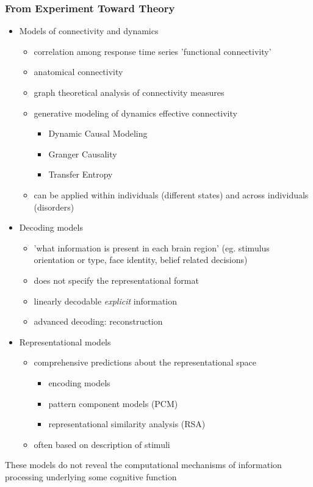 \documentclass[
t, %
10pt, %
aspectratio=1610, %
ngerman,
english,
]{beamer}
\begin{document}
\begin{frame}
    \frametitle{From Experiment Toward Theory}
    \begin{itemize}
     \item Models of connectivity and dynamics
     \begin{itemize}
        \item correlation among response time series \textrightarrow 'functional connectivity'
        \item anatomical connectivity
        \item graph theoretical analysis of connectivity measures
        \item generative modeling of dynamics \textrightarrow effective connectivity
        \begin{itemize}
         \item Dynamic Causal Modeling
         \item Granger Causality
         \item Transfer Entropy
        \end{itemize}
        \item can be applied within individuals (different states) and across individuals (disorders)
     \end{itemize}
     \item Decoding models
     \begin{itemize}
      \item 'what information is present in each brain region' (eg. stimulus orientation or type, face identity, belief related decisions)
      \item does not specify the representational format
      \item linearly decodable \textrightarrow \textit{explicit} information
      \item advanced decoding: reconstruction
     \end{itemize}
     \item Representational models
     \begin{itemize}
      \item comprehensive predictions about the representational space
      \begin{itemize}
       \item encoding models
       \item pattern component models (PCM)
       \item representational similarity analysis (RSA)
      \end{itemize}
     \item often based on description of stimuli
     \end{itemize}
    \end{itemize}
    These models do not reveal the computational mechanisms of information processing underlying some cognitive function
\end{frame}
\end{document}
